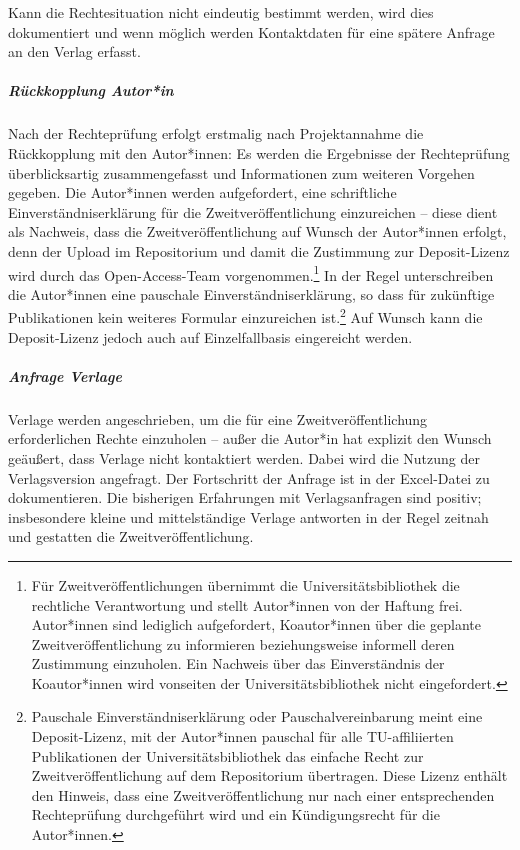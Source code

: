 \documentclass[a4paper,
fontsize=11pt,
oneside,
numbers=noperiodatend,
parskip=half-,
bibliography=totoc,
final
]{scrartcl}
\begin{document}
Kann die Rechtesituation nicht eindeutig bestimmt werden, wird dies
dokumentiert und wenn möglich werden Kontaktdaten für eine spätere
Anfrage an den Verlag erfasst.

\hypertarget{ruxfcckkopplung-autorin}{%
\subparagraph{Rückkopplung Autor*in}\label{ruxfcckkopplung-autorin}}

Nach der Rechteprüfung erfolgt erstmalig nach Projektannahme die
Rückkopplung mit den Autor*innen: Es werden die Ergebnisse der
Rechteprüfung überblicksartig zusammengefasst und Informationen zum
weiteren Vorgehen gegeben. Die Autor*innen werden aufgefordert, eine
schriftliche Einverständniserklärung für die Zweitveröffentlichung
einzureichen -- diese dient als Nachweis, dass die Zweitveröffentlichung
auf Wunsch der Autor*innen erfolgt, denn der Upload im Repositorium und
damit die Zustimmung zur Deposit-Lizenz wird durch das Open-Access-Team
vorgenommen.\footnote{Für Zweitveröffentlichungen übernimmt die
  Universitätsbibliothek die rechtliche Verantwortung und stellt
  Autor*innen von der Haftung frei. Autor*innen sind lediglich
  aufgefordert, Koautor*innen über die geplante Zweitveröffentlichung zu
  informieren beziehungsweise informell deren Zustimmung einzuholen. Ein
  Nachweis über das Einverständnis der Koautor*innen wird vonseiten der
  Universitätsbibliothek nicht eingefordert.} In der Regel
unterschreiben die Autor*innen eine pauschale Einverständniserklärung,
so dass für zukünftige Publikationen kein weiteres Formular einzureichen
ist.\footnote{Pauschale Einverständniserklärung oder
  Pauschalvereinbarung meint eine Deposit-Lizenz, mit der Autor*innen
  pauschal für alle TU-affiliierten Publikationen der
  Universitätsbibliothek das einfache Recht zur Zweitveröffentlichung
  auf dem Repositorium übertragen. Diese Lizenz enthält den Hinweis,
  dass eine Zweitveröffentlichung nur nach einer entsprechenden
  Rechteprüfung durchgeführt wird und ein Kündigungsrecht für die
  Autor*innen.} Auf Wunsch kann die Deposit-Lizenz jedoch auch auf
Einzelfallbasis eingereicht werden.

\hypertarget{anfrage-verlage}{%
\subparagraph{Anfrage Verlage}\label{anfrage-verlage}}

Verlage werden angeschrieben, um die für eine Zweitveröffentlichung
erforderlichen Rechte einzuholen -- außer die Autor*in hat explizit den
Wunsch geäußert, dass Verlage nicht kontaktiert werden. Dabei wird die
Nutzung der Verlagsversion angefragt. Der Fortschritt der Anfrage ist in
der Excel-Datei zu dokumentieren. Die bisherigen Erfahrungen mit
Verlagsanfragen sind positiv; insbesondere kleine und mittelständige
Verlage antworten in der Regel zeitnah und gestatten die
Zweitveröffentlichung.
\end{document}
